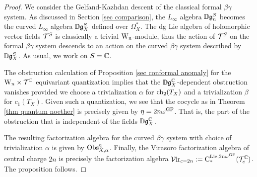 \begin{proof} We consider the Gelfand-Kazhdan descent of the classical formal $\beta\gamma$ system. As  discussed in Section \ref{sec comparison}, the $L_\infty$ algebra $\mathbb D \mathfrak g_n^S$ becomes the curved $L_\infty$ algebra $\mathbb D \mathfrak g_X^S$ defined over $\Omega^*_X$. The dg Lie algebra of holomorphic vector fields $\mathcal T^S$ is classically a trivial ${{\rm W}_n}$-module, thus the action of $\mathcal T^S$ on the formal $\beta\gamma$ system descends to an action on the curved $\beta\gamma$ system described by $\mathbb D \mathfrak g_X^S$. As usual, we work on $S = \mathbb C$. 

The obstruction calculation of Proposition \ref{sec conformal anomaly} for the ${{\rm W}_n} \times \mathcal T^\mathbb C$ equivariant quantization implies that the $\mathbb D \mathfrak g_X^\mathbb C$-dependent obstruction vanishes provided we choose a trivialization $\alpha$ for ${\rm ch}_2(T_X)$ and a trivialization $\beta$ for $c_1(T_X)$. Given such a quantization, we see that the cocycle as in Theorem \ref{thm quantum noether} is precisely given by $\eta = 2 n \omega^{{\rm GF}}$. That is, the part of the obstruction that is independent of the fields $\mathbb D \mathfrak g_X^\mathbb C$. 

The resulting factorization algebra for the curved $\beta\gamma$ system with choice of trivialization $\alpha$ is given by ${\rm Obs}^{\rm q}_{X,\alpha}$. Finally, the Virasoro factorization algebra of central charge $2n$ is precisely the factorization algebra $\mathcal{V}{\rm ir}_{c=2n} := {\rm C}^{{\rm Lie}, 2 n \omega^{{\rm GF}}}_* (\mathcal T^\mathbb C_c)$. The proposition follows.
\end{proof}

